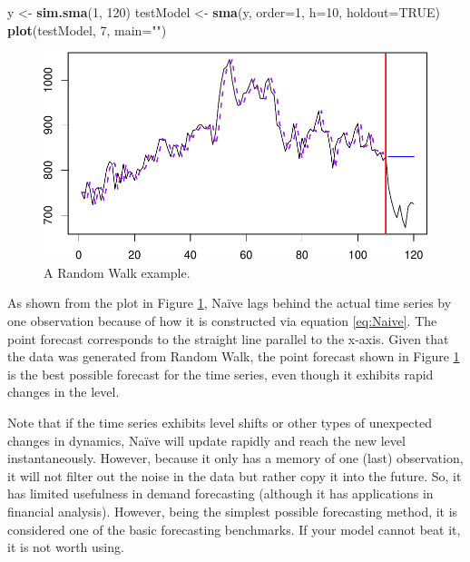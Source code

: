 \documentclass[]{book}
\newenvironment{Shaded}{\begin{snugshade}}{\end{snugshade}}
\newcommand{\DataTypeTok}[1]{\textcolor[rgb]{0.13,0.29,0.53}{#1}}
\newcommand{\DecValTok}[1]{\textcolor[rgb]{0.00,0.00,0.81}{#1}}
\newcommand{\KeywordTok}[1]{\textcolor[rgb]{0.13,0.29,0.53}{\textbf{#1}}}
\newcommand{\NormalTok}[1]{#1}
\newcommand{\OtherTok}[1]{\textcolor[rgb]{0.56,0.35,0.01}{#1}}
\newcommand{\StringTok}[1]{\textcolor[rgb]{0.31,0.60,0.02}{#1}}
\theoremstyle{definition}
\theoremstyle{definition}
\theoremstyle{definition}
\theoremstyle{definition}
\theoremstyle{remark}
\begin{document}
\begin{Shaded}
\begin{Highlighting}[]
\NormalTok{y <-}\StringTok{ }\KeywordTok{sim.sma}\NormalTok{(}\DecValTok{1}\NormalTok{, }\DecValTok{120}\NormalTok{)}
\NormalTok{testModel <-}\StringTok{ }\KeywordTok{sma}\NormalTok{(y, }\DataTypeTok{order=}\DecValTok{1}\NormalTok{,}
                 \DataTypeTok{h=}\DecValTok{10}\NormalTok{, }\DataTypeTok{holdout=}\OtherTok{TRUE}\NormalTok{)}
\KeywordTok{plot}\NormalTok{(testModel, }\DecValTok{7}\NormalTok{, }\DataTypeTok{main=}\StringTok{""}\NormalTok{)}
\end{Highlighting}
\end{Shaded}

\begin{figure}
\centering
\includegraphics{Svetunkov--2022----ADAM_files/figure-latex/naiveExample-1.pdf}
\caption{\label{fig:naiveExample}A Random Walk example.}
\end{figure}

As shown from the plot in Figure \ref{fig:naiveExample}, Naïve lags behind the actual time series by one observation because of how it is constructed via equation \eqref{eq:Naive}. The point forecast corresponds to the straight line parallel to the x-axis. Given that the data was generated from Random Walk, the point forecast shown in Figure \ref{fig:naiveExample} is the best possible forecast for the time series, even though it exhibits rapid changes in the level.

Note that if the time series exhibits level shifts or other types of unexpected changes in dynamics, Naïve will update rapidly and reach the new level instantaneously. However, because it only has a memory of one (last) observation, it will not filter out the noise in the data but rather copy it into the future. So, it has limited usefulness in demand forecasting (although it has applications in financial analysis). However, being the simplest possible forecasting method, it is considered one of the basic forecasting benchmarks. If your model cannot beat it, it is not worth using.
\end{document}
